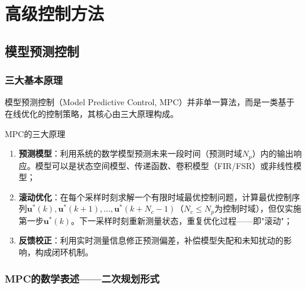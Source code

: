 \chapter{高级控制方法}


\section{模型预测控制}

\subsection{三大基本原理}

模型预测控制（Model Predictive Control, MPC）并非单一算法，而是一类基于在线优化的控制策略，其核心由三大原理构成。

\begin{mydefinition}{MPC的三大原理}
\begin{enumerate}
\item \textbf{预测模型}：利用系统的数学模型预测未来一段时间（预测时域\(N_p\)）内的输出响应。模型可以是状态空间模型、传递函数、卷积模型（FIR/FSR）或非线性模型；
\item \textbf{滚动优化}：在每个采样时刻求解一个有限时域最优控制问题，计算最优控制序列\(\mathbf{u}^*(k), \mathbf{u}^*(k+1), \dots, \mathbf{u}^*(k+N_c-1)\)（\(N_c \le N_p\)为控制时域），但仅实施第一步\(\mathbf{u}^*(k)\)。下一采样时刻重新测量状态，重复优化过程——即"滚动"；
\item \textbf{反馈校正}：利用实时测量信息修正预测偏差，补偿模型失配和未知扰动的影响，构成闭环机制。
\end{enumerate}
\end{mydefinition}

\subsection{MPC的数学表述——二次规划形式}

